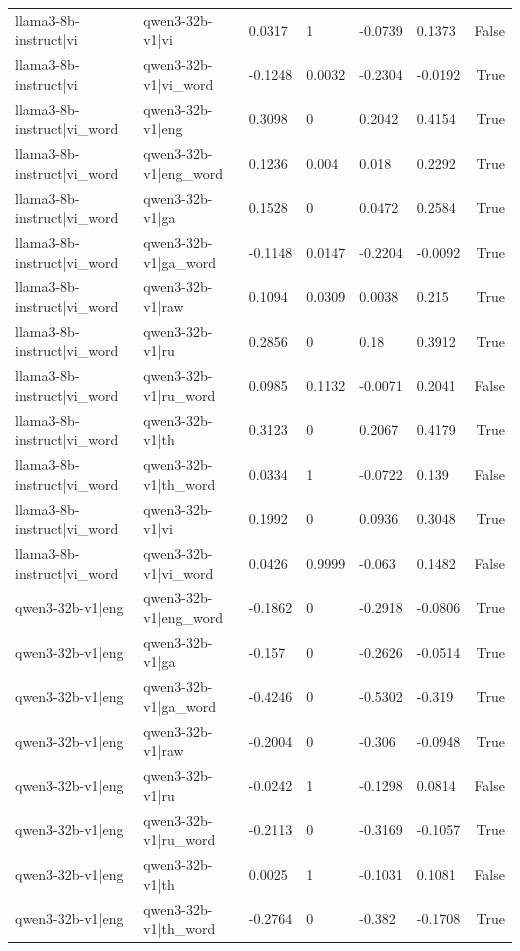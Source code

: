 \begin{table}
\begin{tabular}{llllllr}
llama3-8b-instruct|vi & qwen3-32b-v1|vi & 0.0317 & 1 & -0.0739 & 0.1373 & False \\
llama3-8b-instruct|vi & qwen3-32b-v1|vi_word & -0.1248 & 0.0032 & -0.2304 & -0.0192 & True \\
llama3-8b-instruct|vi_word & qwen3-32b-v1|eng & 0.3098 & 0 & 0.2042 & 0.4154 & True \\
llama3-8b-instruct|vi_word & qwen3-32b-v1|eng_word & 0.1236 & 0.004 & 0.018 & 0.2292 & True \\
llama3-8b-instruct|vi_word & qwen3-32b-v1|ga & 0.1528 & 0 & 0.0472 & 0.2584 & True \\
llama3-8b-instruct|vi_word & qwen3-32b-v1|ga_word & -0.1148 & 0.0147 & -0.2204 & -0.0092 & True \\
llama3-8b-instruct|vi_word & qwen3-32b-v1|raw & 0.1094 & 0.0309 & 0.0038 & 0.215 & True \\
llama3-8b-instruct|vi_word & qwen3-32b-v1|ru & 0.2856 & 0 & 0.18 & 0.3912 & True \\
llama3-8b-instruct|vi_word & qwen3-32b-v1|ru_word & 0.0985 & 0.1132 & -0.0071 & 0.2041 & False \\
llama3-8b-instruct|vi_word & qwen3-32b-v1|th & 0.3123 & 0 & 0.2067 & 0.4179 & True \\
llama3-8b-instruct|vi_word & qwen3-32b-v1|th_word & 0.0334 & 1 & -0.0722 & 0.139 & False \\
llama3-8b-instruct|vi_word & qwen3-32b-v1|vi & 0.1992 & 0 & 0.0936 & 0.3048 & True \\
llama3-8b-instruct|vi_word & qwen3-32b-v1|vi_word & 0.0426 & 0.9999 & -0.063 & 0.1482 & False \\
qwen3-32b-v1|eng & qwen3-32b-v1|eng_word & -0.1862 & 0 & -0.2918 & -0.0806 & True \\
qwen3-32b-v1|eng & qwen3-32b-v1|ga & -0.157 & 0 & -0.2626 & -0.0514 & True \\
qwen3-32b-v1|eng & qwen3-32b-v1|ga_word & -0.4246 & 0 & -0.5302 & -0.319 & True \\
qwen3-32b-v1|eng & qwen3-32b-v1|raw & -0.2004 & 0 & -0.306 & -0.0948 & True \\
qwen3-32b-v1|eng & qwen3-32b-v1|ru & -0.0242 & 1 & -0.1298 & 0.0814 & False \\
qwen3-32b-v1|eng & qwen3-32b-v1|ru_word & -0.2113 & 0 & -0.3169 & -0.1057 & True \\
qwen3-32b-v1|eng & qwen3-32b-v1|th & 0.0025 & 1 & -0.1031 & 0.1081 & False \\
qwen3-32b-v1|eng & qwen3-32b-v1|th_word & -0.2764 & 0 & -0.382 & -0.1708 & True \\

\end{tabular}
\end{table}
